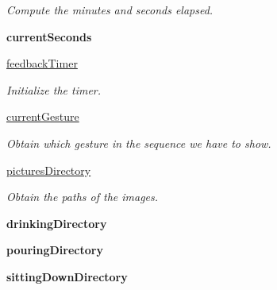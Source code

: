 \begin{DoxyCompactItemize}
\begin{DoxyCompactList}\small\item\em Compute the minutes and seconds elapsed. \end{DoxyCompactList}\item 
{\bfseries current\+Seconds}\hypertarget{classGUI__node_1_1MainWindow_a89150cd6e6efbcef048ddb26e1e6098e}{}\label{classGUI__node_1_1MainWindow_a89150cd6e6efbcef048ddb26e1e6098e}

\item 
\hyperlink{classGUI__node_1_1MainWindow_ab596564bce73cc26dd6dd81e94f93159}{feedback\+Timer}\hypertarget{classGUI__node_1_1MainWindow_ab596564bce73cc26dd6dd81e94f93159}{}\label{classGUI__node_1_1MainWindow_ab596564bce73cc26dd6dd81e94f93159}

\begin{DoxyCompactList}\small\item\em Initialize the timer. \end{DoxyCompactList}\item 
\hyperlink{classGUI__node_1_1MainWindow_aac86778a09138bea9fac784d6256f4cb}{current\+Gesture}
\begin{DoxyCompactList}\small\item\em Obtain which gesture in the sequence we have to show. \end{DoxyCompactList}\item 
\hyperlink{classGUI__node_1_1MainWindow_a6f44d633cb128524551a433c500082c5}{pictures\+Directory}\hypertarget{classGUI__node_1_1MainWindow_a6f44d633cb128524551a433c500082c5}{}\label{classGUI__node_1_1MainWindow_a6f44d633cb128524551a433c500082c5}

\begin{DoxyCompactList}\small\item\em Obtain the paths of the images. \end{DoxyCompactList}\item 
{\bfseries drinking\+Directory}\hypertarget{classGUI__node_1_1MainWindow_a6880bc39288e7eff3e1a6ee132811a67}{}\label{classGUI__node_1_1MainWindow_a6880bc39288e7eff3e1a6ee132811a67}

\item 
{\bfseries pouring\+Directory}\hypertarget{classGUI__node_1_1MainWindow_a9ecd6cbf5e957c2bfe46d9c8b2efe557}{}\label{classGUI__node_1_1MainWindow_a9ecd6cbf5e957c2bfe46d9c8b2efe557}

\item 
{\bfseries sitting\+Down\+Directory}\hypertarget{classGUI__node_1_1MainWindow_ad1bd5e902a73e956cc04f2418da7df26}{}\label{classGUI__node_1_1MainWindow_ad1bd5e902a73e956cc04f2418da7df26}


\end{DoxyCompactItemize}
